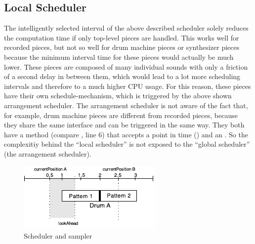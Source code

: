 \subsection{Local Scheduler}
\label{subsec:local-scheduler}

The intelligently selected interval of the above described scheduler solely reduces the computation time if only top-level pieces are handled. This works well for recorded pieces, but not so well for drum machine pieces or synthesizer pieces because the minimum interval time for these pieces would actually be much lower. These pieces are composed of many individual sounds with only a friction of a second delay in between them, which would lead to a lot more scheduling intervals and therefore to a much higher CPU usage. For this reason, these pieces have their own schedule-mechanism, which is triggered by the above shown arrangement scheduler. The arrangement scheduler is not aware of the fact that, for example, drum machine pieces are different from recorded pieces, because they share the same interface and can be triggered in the same way. They both have a  method (compare , line 6) that accepts a point in time () and an . So the complexitiy behind the ``local scheduler'' is not exposed to the ``global scheduler'' (the arrangement scheduler).

\begin{figure}[htb]
  \centerline{\includegraphics[width=0.9\linewidth]{images/Scheduler_Example_Drum.pdf}}
  \caption[Scheduler and sampler]{Scheduler and sampler}
  \label{fig:scheduler-sampler}
\end{figure}


